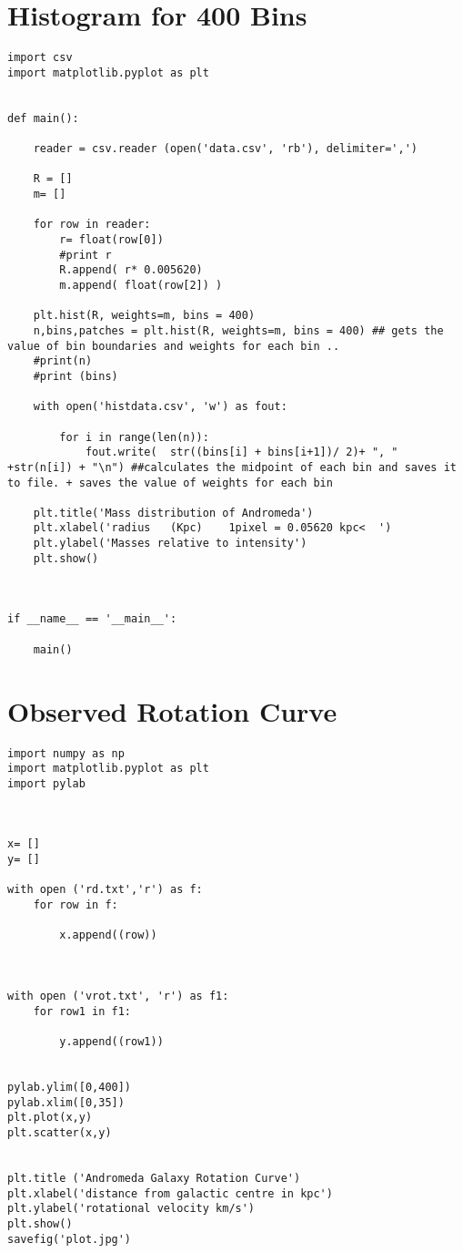\section{Histogram for 400 Bins}
\begin{Verbatim}[fontsize=\small,baselinestretch=0.9]
import csv
import matplotlib.pyplot as plt


def main():

    reader = csv.reader (open('data.csv', 'rb'), delimiter=',')

    R = []
    m= []

    for row in reader:
        r= float(row[0])
        #print r
        R.append( r* 0.005620)
        m.append( float(row[2]) )

    plt.hist(R, weights=m, bins = 400)
    n,bins,patches = plt.hist(R, weights=m, bins = 400) ## gets the value of bin boundaries and weights for each bin ..
    #print(n)
    #print (bins)

    with open('histdata.csv', 'w') as fout:

        for i in range(len(n)):
            fout.write(  str((bins[i] + bins[i+1])/ 2)+ ", " +str(n[i]) + "\n") ##calculates the midpoint of each bin and saves it to file. + saves the value of weights for each bin

    plt.title('Mass distribution of Andromeda')
    plt.xlabel('radius   (Kpc)    1pixel = 0.05620 kpc<  ')
    plt.ylabel('Masses relative to intensity')
    plt.show()



if __name__ == '__main__':

    main()
\end{Verbatim}


\section{Observed Rotation Curve}
\begin{Verbatim}[fontsize=\small,baselinestretch=0.9]
import numpy as np
import matplotlib.pyplot as plt
import pylab



x= []
y= []

with open ('rd.txt','r') as f:
    for row in f:

        x.append((row))



with open ('vrot.txt', 'r') as f1:
    for row1 in f1:

        y.append((row1))


pylab.ylim([0,400])
pylab.xlim([0,35])
plt.plot(x,y)
plt.scatter(x,y)


plt.title ('Andromeda Galaxy Rotation Curve')
plt.xlabel('distance from galactic centre in kpc')
plt.ylabel('rotational velocity km/s')
plt.show()
savefig('plot.jpg')

\end{Verbatim}

